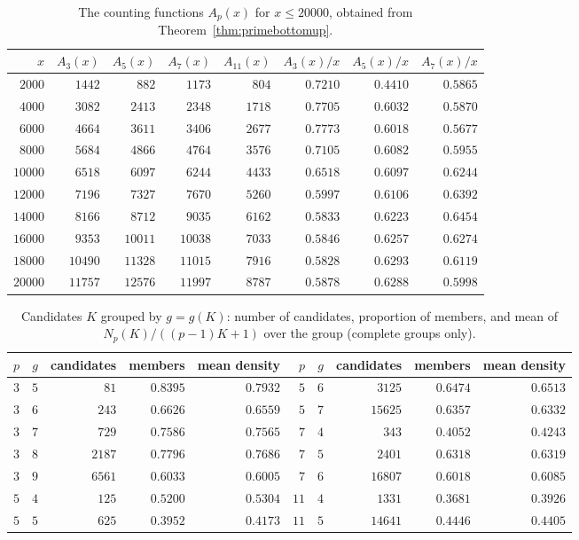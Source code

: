 \documentclass[11pt]{amsart}
\theoremstyle{definition}
\begin{document}
\begin{table}[H]
\centering
\caption{The counting functions $A_p(x)$ for $x\le20000$, obtained from Theorem~\ref{thm:primebottomup}.}
\label{tab:primes10000}
\begin{tabular}{rrrrrrrr}
\toprule
$x$ & $A_3(x)$ & $A_5(x)$ & $A_7(x)$ & $A_{11}(x)$ & $A_3(x)/x$ & $A_5(x)/x$ & $A_7(x)/x$\\
\midrule
$2000$ & $1442$ & $882$ & $1173$ & $804$ & $0.7210$ & $0.4410$ & $0.5865$\\
$4000$ & $3082$ & $2413$ & $2348$ & $1718$ & $0.7705$ & $0.6032$ & $0.5870$\\
$6000$ & $4664$ & $3611$ & $3406$ & $2677$ & $0.7773$ & $0.6018$ & $0.5677$\\
$8000$ & $5684$ & $4866$ & $4764$ & $3576$ & $0.7105$ & $0.6082$ & $0.5955$\\
$10000$ & $6518$ & $6097$ & $6244$ & $4433$ & $0.6518$ & $0.6097$ & $0.6244$\\
$12000$ & $7196$ & $7327$ & $7670$ & $5260$ & $0.5997$ & $0.6106$ & $0.6392$\\
$14000$ & $8166$ & $8712$ & $9035$ & $6162$ & $0.5833$ & $0.6223$ & $0.6454$\\
$16000$ & $9353$ & $10011$ & $10038$ & $7033$ & $0.5846$ & $0.6257$ & $0.6274$\\
$18000$ & $10490$ & $11328$ & $11015$ & $7916$ & $0.5828$ & $0.6293$ & $0.6119$\\
$20000$ & $11757$ & $12576$ & $11997$ & $8787$ & $0.5878$ & $0.6288$ & $0.5998$\\
\bottomrule
\end{tabular}
\end{table}

\begin{table}[H]
\centering
\caption{Candidates $K$ grouped by $g=g(K)$: number of candidates, proportion of members, and mean of $N_p(K)/((p-1)K+1)$ over the group (complete groups only).}
\label{tab:primegroups}
\begin{tabular}{rrrrr@{\qquad}rrrrr}
\toprule
$p$ & $g$ & candidates & members & mean density & $p$ & $g$ & candidates & members & mean density\\
\midrule
$3$ & $5$ & $81$ & $0.8395$ & $0.7932$ & $5$ & $6$ & $3125$ & $0.6474$ & $0.6513$\\
$3$ & $6$ & $243$ & $0.6626$ & $0.6559$ & $5$ & $7$ & $15625$ & $0.6357$ & $0.6332$\\
$3$ & $7$ & $729$ & $0.7586$ & $0.7565$ & $7$ & $4$ & $343$ & $0.4052$ & $0.4243$\\
$3$ & $8$ & $2187$ & $0.7796$ & $0.7686$ & $7$ & $5$ & $2401$ & $0.6318$ & $0.6319$\\
$3$ & $9$ & $6561$ & $0.6033$ & $0.6005$ & $7$ & $6$ & $16807$ & $0.6018$ & $0.6085$\\
$5$ & $4$ & $125$ & $0.5200$ & $0.5304$ & $11$ & $4$ & $1331$ & $0.3681$ & $0.3926$\\
$5$ & $5$ & $625$ & $0.3952$ & $0.4173$ & $11$ & $5$ & $14641$ & $0.4446$ & $0.4405$\\
\bottomrule
\end{tabular}
\end{table}
\end{document}
